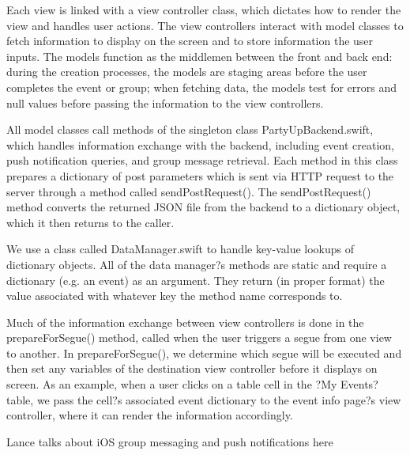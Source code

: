 \documentclass[12pt]{article}
\begin{document}
Each view is linked with a view controller class, which dictates how to render the view and handles user actions. The view controllers interact with model classes to fetch information to display on the screen and to store information the user inputs. The models function as the middlemen between the front and back end: during the creation processes, the models are staging areas before the user completes the event or group; when fetching data, the models test for errors and null values before passing the information to the view controllers.

All model classes call methods of the singleton class PartyUpBackend.swift, which handles information exchange with the backend, including event creation, push notification queries, and group message retrieval. Each method in this class prepares a dictionary of post parameters which is sent via HTTP request to the server through a method called sendPostRequest(). The sendPostRequest() method converts the returned JSON file from the backend to a dictionary object, which it then returns to the caller.

We use a class called DataManager.swift to handle key-value lookups of dictionary objects. All of the data manager?s methods are static and require a dictionary (e.g. an event) as an argument. They return (in proper format) the value associated with whatever key the method name corresponds to. 

Much of the information exchange between view controllers is done in the prepareForSegue() method, called when the user triggers a segue from one view to another. In prepareForSegue(), we determine which segue will be executed and then set any variables of the destination view controller before it displays on screen. As an example, when a user clicks on a table cell in the ?My Events? table, we pass the cell?s associated event dictionary to the event info page?s view controller, where it can render the information accordingly. 

Lance talks about iOS group messaging and push notifications here
\end{document}
